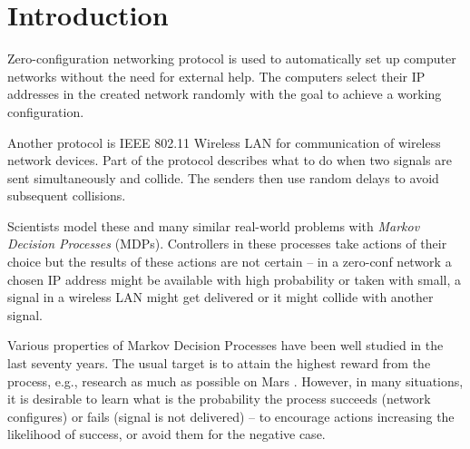 \chapter{Introduction}


Zero-configuration networking protocol is used to automatically set up
computer networks without the need for external help. The computers
select their IP addresses in the created network randomly with the goal
to achieve a working configuration.

Another protocol is IEEE 802.11 Wireless LAN for communication
of wireless network devices. Part of the protocol describes what to do
when two signals are sent simultaneously and collide. The senders then
use random delays to avoid subsequent collisions.


Scientists model these and many similar real-world problems with {\em
Markov Decision Processes} (MDPs). Controllers in these processes take
actions of their choice but the results of these actions are not
certain -- in a zero-conf network a chosen IP address might be available
with high probability or taken with small, a signal in a wireless LAN
might get delivered or it might collide with another signal.

Various properties of Markov Decision Processes have been well studied
in the last seventy years. The usual target is to attain the highest
reward from the process, e.g., research as much as possible on Mars
\parencite{MarsRover}.
However, in many situations, it is desirable to learn what is the
probability the process succeeds (network
configures) or fails (signal is not delivered) --
to encourage actions increasing the likelihood of success,
or avoid them for the negative case.

